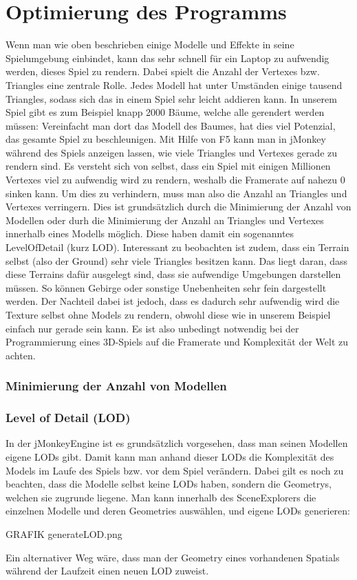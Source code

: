 \section{Optimierung des Programms}\label{sec:optimizing}
Wenn man wie oben beschrieben einige Modelle und Effekte in seine Spielumgebung einbindet, kann das sehr schnell für ein Laptop zu aufwendig werden, dieses Spiel zu rendern. Dabei spielt die Anzahl der Vertexes bzw. Triangles eine zentrale Rolle. Jedes Modell hat unter Umständen einige tausend Triangles, sodass sich das in einem Spiel sehr leicht addieren kann. In unserem Spiel gibt es zum Beispiel knapp 2000 Bäume, welche alle gerendert werden müssen: Vereinfacht man dort das Modell des Baumes, hat dies viel Potenzial, das gesamte Spiel zu beschleunigen. Mit Hilfe von F5 kann man in jMonkey während des Spiels anzeigen lassen, wie viele Triangles und Vertexes gerade zu rendern sind. Es versteht sich von selbst, dass ein Spiel mit einigen Millionen Vertexes viel zu aufwendig wird zu rendern, weshalb die Framerate auf nahezu 0 sinken kann. Um dies zu verhindern, muss man also die Anzahl an Triangles und Vertexes verringern. Dies ist grundsätzlich durch die Minimierung der Anzahl von Modellen oder durh die Minimierung der Anzahl an Triangles und Vertexes innerhalb eines Modells möglich. Diese haben damit ein sogenanntes LevelOfDetail (kurz LOD). Interessant zu beobachten ist zudem, dass ein Terrain selbst (also der Ground) sehr viele Triangles besitzen kann. Das liegt daran, dass diese Terrains dafür ausgelegt sind, dass sie aufwendige Umgebungen darstellen müssen. So können Gebirge oder sonstige Unebenheiten sehr fein dargestellt werden. Der Nachteil dabei ist jedoch, dass es dadurch sehr aufwendig wird die Texture selbst ohne Models zu rendern, obwohl diese wie in unserem Beispiel einfach nur gerade sein kann. Es ist also unbedingt notwendig bei der Programmierung eines 3D-Spiels auf die Framerate und Komplexität der Welt zu achten.



\subsubsection{Minimierung der Anzahl von Modellen}

\subsubsection{Level of Detail (LOD)}
In der jMonkeyEngine ist es grundsätzlich vorgesehen, dass man seinen Modellen eigene LODs gibt. Damit kann man anhand dieser LODs die Komplexität des Models im Laufe des Spiels bzw. vor dem Spiel verändern. Dabei gilt es noch zu beachten, dass die Modelle selbst keine LODs haben, sondern die Geometrys, welchen sie zugrunde liegene. Man kann innerhalb des SceneExplorers die einzelnen Modelle und deren Geometries auswählen, und eigene LODs generieren:

GRAFIK generateLOD.png

Ein alternativer Weg wäre, dass man der Geometry eines vorhandenen Spatials während der Laufzeit einen neuen LOD zuweist. 



